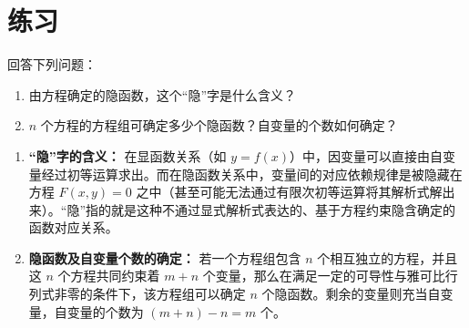 \documentclass[lang=cn,11pt]{elegantbook}
\begin{document}
\section{练习}

\begin{exercise}[隐函数的基本概念]
回答下列问题：
\begin{enumerate}
  \item[(1)] 由方程确定的隐函数，这个“隐”字是什么含义？
  \item[(2)] $n$ 个方程的方程组可确定多少个隐函数？自变量的个数如何确定？
\end{enumerate}
\end{exercise}
\begin{solution}
\begin{enumerate}
  \item[(1)] \textbf{“隐”字的含义：}
  在显函数关系（如 $y=f(x)$）中，因变量可以直接由自变量经过初等运算求出。而在隐函数关系中，变量间的对应依赖规律是被隐藏在方程 $F(x,y)=0$ 之中（甚至可能无法通过有限次初等运算将其解析式解出来）。“隐”指的就是这种不通过显式解析式表达的、基于方程约束隐含确定的函数对应关系。

  \item[(2)] \textbf{隐函数及自变量个数的确定：}
  若一个方程组包含 $n$ 个相互独立的方程，并且这 $n$ 个方程共同约束着 $m+n$ 个变量，那么在满足一定的可导性与雅可比行列式非零的条件下，该方程组可以确定 $n$ 个隐函数。剩余的变量则充当自变量，自变量的个数为 $(m+n) - n = m$ 个。
\end{enumerate}
\end{solution}
\end{document}
